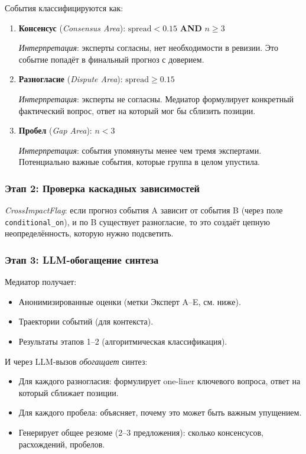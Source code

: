 События классифицируются как:

\begin{enumerate}
    \item \textbf{Консенсус} (\emph{Consensus Area}): $\text{spread} < 0.15$ \textbf{AND} $n \geq 3$

    \textit{Интерпретация}: эксперты согласны, нет необходимости в ревизии. Это событие попадёт в финальный прогноз с доверием.

    \item \textbf{Разногласие} (\emph{Dispute Area}): $\text{spread} \geq 0.15$

    \textit{Интерпретация}: эксперты не согласны. Медиатор формулирует конкретный фактический вопрос, ответ на который мог бы сблизить позиции.

    \item \textbf{Пробел} (\emph{Gap Area}): $n < 3$

    \textit{Интерпретация}: события упомянуты менее чем тремя экспертами. Потенциально важные события, которые группа в целом упустила.
\end{enumerate}

\subsubsection{Этап 2: Проверка каскадных зависимостей}

\emph{CrossImpactFlag}: если прогноз события A зависит от события B (через поле \texttt{conditional\_on}), и по B существует разногласие, то это создаёт цепную неопределённость, которую нужно подсветить.

\subsubsection{Этап 3: LLM-обогащение синтеза}

Медиатор получает:
\begin{itemize}
    \item Анонимизированные оценки (метки Эксперт A–E, см. ниже).
    \item Траектории событий (для контекста).
    \item Результаты этапов 1–2 (алгоритмическая классификация).
\end{itemize}

И через LLM-вызов \emph{обогащает} синтез:
\begin{itemize}
    \item Для каждого разногласия: формулирует one-liner ключевого вопроса, ответ на который сближает позиции.
    \item Для каждого пробела: объясняет, почему это может быть важным упущением.
    \item Генерирует общее резюме (2–3 предложения): сколько консенсусов, расхождений, пробелов.
\end{itemize}

